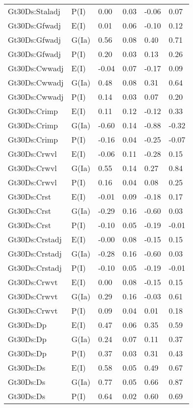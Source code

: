 \begin{center}
\begin{longtable}{|p{1.1in}|p{0.7in}|p{0.7in}|p{0.6in}|p{0.6in}|p{0.6in}|}
  Gt30Ds:Staladj & P(I) & 0.00 & 0.03 & -0.06 & 0.07 \\ 
  Gt30Ds:Gfwadj & E(I) & 0.01 & 0.06 & -0.10 & 0.12 \\ 
  Gt30Ds:Gfwadj & G(Ia) & 0.56 & 0.08 & 0.40 & 0.71 \\ 
  Gt30Ds:Gfwadj & P(I) & 0.20 & 0.03 & 0.13 & 0.26 \\ 
  Gt30Ds:Cwwadj & E(I) & -0.04 & 0.07 & -0.17 & 0.09 \\ 
  Gt30Ds:Cwwadj & G(Ia) & 0.48 & 0.08 & 0.31 & 0.64 \\ 
  Gt30Ds:Cwwadj & P(I) & 0.14 & 0.03 & 0.07 & 0.20 \\ 
  Gt30Ds:Crimp & E(I) & 0.11 & 0.12 & -0.12 & 0.33 \\ 
  Gt30Ds:Crimp & G(Ia) & -0.60 & 0.14 & -0.88 & -0.32 \\ 
  Gt30Ds:Crimp & P(I) & -0.16 & 0.04 & -0.25 & -0.07 \\ 
  Gt30Ds:Crwvl & E(I) & -0.06 & 0.11 & -0.28 & 0.15 \\ 
  Gt30Ds:Crwvl & G(Ia) & 0.55 & 0.14 & 0.27 & 0.84 \\ 
  Gt30Ds:Crwvl & P(I) & 0.16 & 0.04 & 0.08 & 0.25 \\ 
  Gt30Ds:Crst & E(I) & -0.01 & 0.09 & -0.18 & 0.17 \\ 
  Gt30Ds:Crst & G(Ia) & -0.29 & 0.16 & -0.60 & 0.03 \\ 
  Gt30Ds:Crst & P(I) & -0.10 & 0.05 & -0.19 & -0.01 \\ 
  Gt30Ds:Crstadj & E(I) & -0.00 & 0.08 & -0.15 & 0.15 \\ 
  Gt30Ds:Crstadj & G(Ia) & -0.28 & 0.16 & -0.60 & 0.03 \\ 
  Gt30Ds:Crstadj & P(I) & -0.10 & 0.05 & -0.19 & -0.01 \\ 
  Gt30Ds:Crwvt & E(I) & 0.00 & 0.08 & -0.15 & 0.15 \\ 
  Gt30Ds:Crwvt & G(Ia) & 0.29 & 0.16 & -0.03 & 0.61 \\ 
  Gt30Ds:Crwvt & P(I) & 0.09 & 0.04 & 0.01 & 0.18 \\ 
  Gt30Ds:Dp & E(I) & 0.47 & 0.06 & 0.35 & 0.59 \\ 
  Gt30Ds:Dp & G(Ia) & 0.24 & 0.07 & 0.11 & 0.37 \\ 
  Gt30Ds:Dp & P(I) & 0.37 & 0.03 & 0.31 & 0.43 \\ 
  Gt30Ds:Ds & E(I) & 0.58 & 0.05 & 0.49 & 0.67 \\ 
  Gt30Ds:Ds & G(Ia) & 0.77 & 0.05 & 0.66 & 0.87 \\ 
  Gt30Ds:Ds & P(I) & 0.64 & 0.02 & 0.60 & 0.69 \\ 

\end{longtable}
\end{center}
